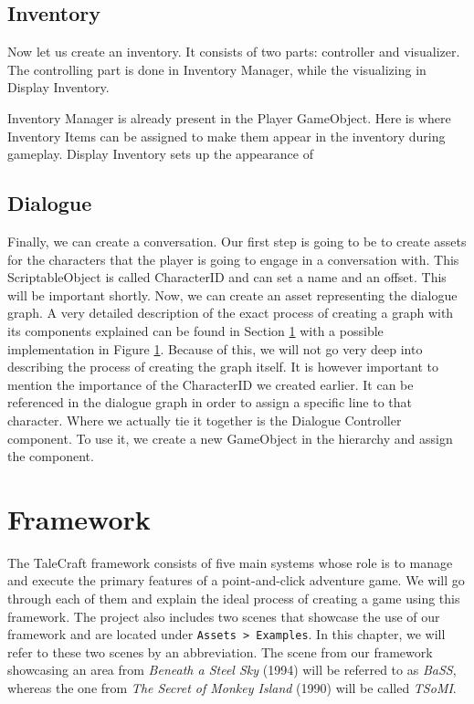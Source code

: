 \subsection{Inventory}
Now let us create an inventory. It consists of two parts: controller and visualizer. The controlling part is done in Inventory Manager, while the visualizing in Display Inventory. 

Inventory Manager is already present in the Player GameObject. Here is where Inventory Items can be assigned to make them appear in the inventory during gameplay. Display Inventory sets up the appearance of 


\subsection{Dialogue}
Finally, we can create a conversation. Our first step is going to be to create assets for the characters that the player is going to engage in a conversation with. This ScriptableObject is called CharacterID and can set a name and an offset. This will be important shortly. Now, we can create an asset representing the dialogue graph. A very detailed description of the exact process of creating a graph with its components explained can be found in Section \ref{} with a possible implementation in Figure \ref{}. Because of this, we will not go very deep into describing the process of creating the graph itself. It is however important to mention the importance of the CharacterID we created earlier. It can be referenced in the dialogue graph in order to assign a specific line to that character. Where we actually tie it together is the Dialogue Controller component. To use it, we create a new GameObject in the hierarchy and assign the component. 


\section{Framework}
The TaleCraft framework consists of five main systems whose role is to manage and execute the primary features of a point-and-click adventure game. We will go through each of them and explain the ideal process of creating a game using this framework. The project also includes two scenes that showcase the use of our framework and are located under \verb|Assets > Examples|. In this chapter, we will refer to these two scenes by an abbreviation. The scene from our framework showcasing an area from \textit{Beneath a Steel Sky} (1994) will be referred to as \textit{BaSS}, whereas the one from \textit{The Secret of Monkey Island} (1990) will be called \textit{TSoMI}.

